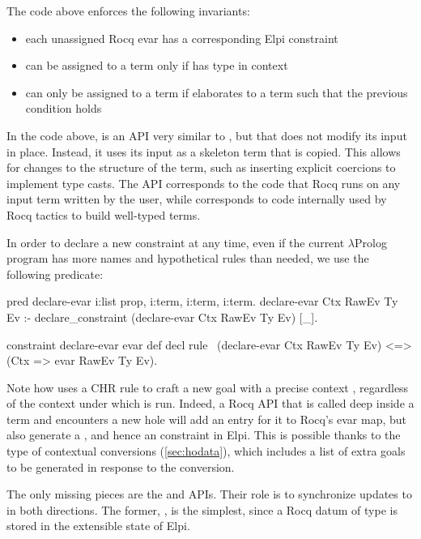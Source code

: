\documentclass{these-ISSS}
\newenvironment{elpicode}
  {\VerbatimEnvironment\begin{elpibox}\begin{xelpicode}}{\end{xelpicode}
\end{elpibox}}
\begin{document}
\noindent
The code above enforces the following invariants:

\begin{itemize}
  \item each unassigned Rocq evar has a corresponding Elpi constraint
  \item {} can be assigned to a term  only if
         has type  in context 
  \item {} can only be assigned to a term  if
         elaborates to a term  such that
        the previous condition holds
\end{itemize}

\noindent
In the code above,  is an API very similar to
, but that does not modify its input in place. Instead, it
uses its input as a skeleton term that is copied. This allows for changes to
the structure of the term, such as inserting explicit coercions to implement
type casts. The API corresponds to the code that Rocq runs on any input term
written by the user, while  corresponds to code
internally used by Rocq tactics to build well-typed terms.

In order to declare a new  constraint at any time, even if the
current $\lambda$Prolog program has more names and hypothetical rules than
needed, we use the following predicate:

\begin{elpicode}
pred declare-evar i:list prop, i:term, i:term, i:term.
declare-evar Ctx RawEv Ty Ev :-
  declare_constraint (declare-evar Ctx RawEv Ty Ev) [_].

constraint declare-evar evar def decl {
  rule \ (declare-evar Ctx RawEv Ty Ev) <=> (Ctx => evar RawEv Ty Ev).
}
\end{elpicode}

\noindent
Note how  uses a CHR rule to craft a new goal with a
precise context , regardless of the context under which
 is run. Indeed, a Rocq API that is called deep
inside a term and encounters a new hole will add an entry for it to Rocq's
evar map, but also generate a , and hence an 
constraint in Elpi. This is possible thanks to the type of contextual
conversions (\cref{sec:hodata}), which includes a list of extra goals to be generated in response
to the conversion.

The only missing pieces are the  and 
APIs. Their role is to synchronize updates to  in both
directions. The former, , is the simplest, since a Rocq
datum of type  is stored in the extensible state of Elpi.
\end{document}
